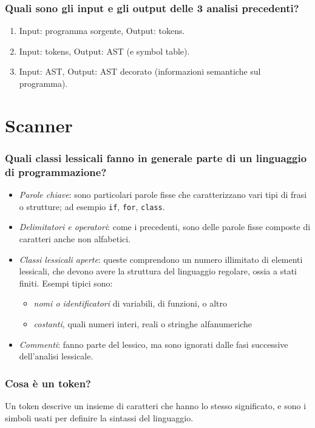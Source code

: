 \documentclass[11pt]{article}
\begin{document}
\subsubsection*{Quali sono gli input e gli output delle 3 analisi precedenti?}
\begin{enumerate}
    \item Input: programma sorgente, Output: tokens.
    \item Input: tokens, Output: AST (e symbol table).
    \item Input: AST, Output: AST decorato (informazioni semantiche sul programma).
\end{enumerate}
\section*{Scanner}
\subsubsection*{Quali classi lessicali fanno in generale parte di un linguaggio di programmazione?}
\begin{itemize}
    \item \textit{Parole chiave}: sono particolari parole fisse che caratterizzano vari tipi di frasi o strutture; ad esempio 
    \texttt{if}, \texttt{for}, \texttt{class}.
    \item \textit{Delimitatori e operatori}: come i precedenti, sono delle parole fisse composte di caratteri anche non 
    alfabetici.
    \item \textit{Classi lessicali aperte}: queste comprendono un numero illimitato di elementi lessicali, che devono 
    avere la struttura del linguaggio regolare, ossia a stati finiti. Esempi tipici sono:
    \begin{itemize}
        \item \textit{nomi o identificatori} di variabili, di funzioni, o altro
        \item \textit{costanti}, quali numeri interi, reali o stringhe alfanumeriche
    \end{itemize}
    \item \textit{Commenti}: fanno parte del lessico, ma sono ignorati dalle fasi successive dell'analisi lessicale.
\end{itemize}
\subsubsection*{Cosa è un token?}
Un token descrive un insieme di caratteri che hanno lo stesso significato, e sono i simboli usati per definire la sintassi 
del linguaggio.
\end{document}
